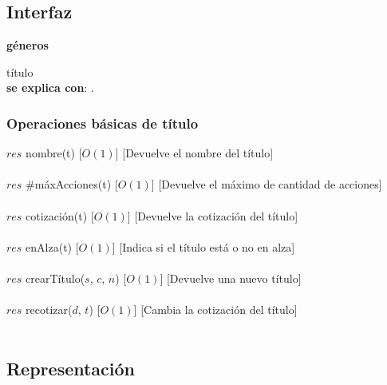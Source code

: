 \subsection{Interfaz}


   \parbox{1.7cm}{\textbf{g\'eneros}} t\'itulo\\
    
  \textbf{se explica con}: .


  \subsubsection{Operaciones b\'asicas de t\'itulo}

  {$res$ \igobs nombre(t)}
  [$O(1)$]
  [Devuelve el nombre del t\'itulo]\\\\

  {$res$ \igobs $\#$m\'axAcciones(t)}
  [$O(1)$]
  [Devuelve el m\'aximo de cantidad de acciones]\\\\

  {$res$ \igobs cotizaci\'on(t)}
  [$O(1)$]
  [Devuelve la cotizaci\'on del t\'itulo]\\\\

  {$res$ \igobs enAlza(t)}
  [$O(1)$]
  [Indica si el t\'itulo est\'a o no en alza]\\\\

  {$res$ \igobs crearT\'itulo($s$, $c$, $n$)}
  [$O(1)$]
  [Devuelve una nuevo t\'itulo]\\\\

  {$res$ \igobs recotizar($d$, $t$)}
  [$O(1)$]
  [Cambia la cotizaci\'on del t\'itulo]\\\\


\subsection{Representaci\'on}

